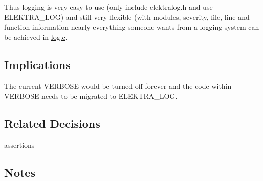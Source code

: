Thus logging is very easy to use (only include {\ttfamily elektralog.\+h} and use {\ttfamily E\+L\+E\+K\+T\+R\+A\+\_\+\+L\+OG}) and still very flexible (with modules, severity, file, line and function information nearly everything someone wants from a logging system can be achieved in {\ttfamily \hyperlink{log_8c}{log.\+c}}.

\subsection*{Implications}

The current V\+E\+R\+B\+O\+SE would be turned off forever and the code within V\+E\+R\+B\+O\+SE needs to be migrated to {\ttfamily E\+L\+E\+K\+T\+R\+A\+\_\+\+L\+OG}.

\subsection*{Related Decisions}


\begin{DoxyItemize}
\item assertions
\end{DoxyItemize}

\subsection*{Notes}